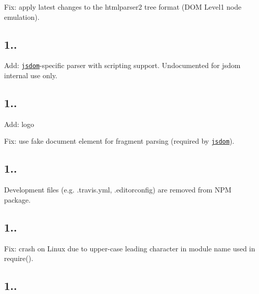 \begin{DoxyItemize}
\item Fix\+: apply latest changes to the {\ttfamily htmlparser2} tree format (D\+OM Level1 node emulation).
\end{DoxyItemize}

\subsection*{1..}


\begin{DoxyItemize}
\item Add\+: \href{https://github.com/tmpvar/jsdom}{\tt jsdom}-\/specific parser with scripting support. Undocumented for {\ttfamily jsdom} internal use only.
\end{DoxyItemize}

\subsection*{1..}


\begin{DoxyItemize}
\item Add\+: logo
\item Fix\+: use fake {\ttfamily document} element for fragment parsing (required by \href{https://github.com/tmpvar/jsdom}{\tt jsdom}).
\end{DoxyItemize}

\subsection*{1..}


\begin{DoxyItemize}
\item Development files (e.\+g. {\ttfamily .travis.\+yml}, {\ttfamily .editorconfig}) are removed from N\+PM package.
\end{DoxyItemize}

\subsection*{1..}


\begin{DoxyItemize}
\item Fix\+: crash on Linux due to upper-\/case leading character in module name used in {\ttfamily require()}.
\end{DoxyItemize}

\subsection*{1..}


